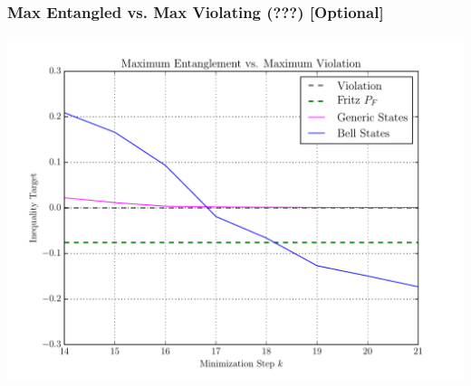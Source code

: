\documentclass[
    hyperref={bookmarks=false},%
    xcolor={dvipsnames},
]{beamer}
\begin{document}
\begin{frame}
    \frametitle{Max Entangled vs. Max Violating (???) [Optional]}
    \includegraphics[width=\linewidth]{../../figures/optimizations/Max_Entanglement_vs_Max_Violation_random_seed_Zoomed.pdf}
\end{frame}
\end{document}
